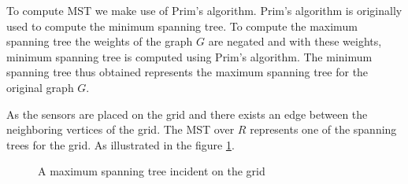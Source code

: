 To compute MST we make use of Prim's algorithm\cite{BLTJ:BLTJ1515}.  Prim's algorithm is originally used to compute the minimum spanning tree. To compute the maximum spanning tree the weights of the graph $G$ are negated and with these weights, minimum spanning tree is computed using Prim's algorithm. The minimum spanning tree thus obtained represents the maximum spanning tree for the original graph $G$.

As the sensors are placed on the grid and there exists an edge between the neighboring vertices of the grid. The MST over ${R}$ represents one of the spanning trees for the grid. As illustrated in the figure \ref{fig:MST}.

\begin{figure}[!ht]
\qquad \qquad \qquad
{}
\caption{A maximum spanning tree incident on the grid}
\label{fig:MST}
\end{figure}




